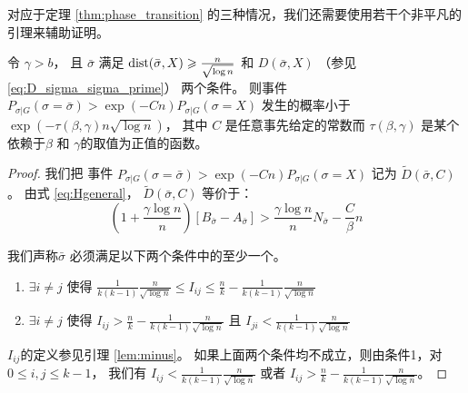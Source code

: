   对应于定理 \ref{thm:phase_transition}  的三种情况，我们还需要使用若干个非平凡的引理来辅助证明。

  \begin{lemma}\label{lem:sigmaX}
    令 $\gamma > b$， 且 $\bar{\sigma}$ 满足 $\operatorname{dist}(\bar{\sigma}, X) \geqslant \frac{n}{\sqrt{\log n}}$
    和 $D(\bar{\sigma}, X)$
    （参见\eqref{eq:D_sigma_sigma_prime}）
    两个条件。
    则事件
    $P_{\sigma | G}(\sigma = \bar{\sigma} ) > \exp(-Cn) P_{\sigma | G}(\sigma = X)$
    发生的概率小于 $\exp(-\tau(\beta, \gamma) n \sqrt{\log  n} )$，
    其中 $C$ 是任意事先给定的常数而 
    $\tau(\beta, \gamma)$
   是某个依赖于$\beta$ 和 $\gamma$的取值为正值的函数。
  \end{lemma}
  \begin{proof}
    我们把 事件 $P_{\sigma | G}(\sigma = \bar{\sigma} ) > \exp(-Cn) P_{\sigma | G}(\sigma = X)$
    记为 $\widetilde{D}(\bar{\sigma}, C)$。
    由式 \eqref{eq:Hgeneral}， $\widetilde{D}(\bar{\sigma}, C)$
    等价于：
  \begin{equation}\label{eq:BwA}
    \left(1 + \frac{\gamma \log n}{n} \right)
    [B_{\bar{\sigma}} - A_{\bar{\sigma}}] >  \frac{\gamma \log n}{n} N_{\bar{\sigma}}  - \frac{C}{\beta} n
    \end{equation}  
    
    我们声称$\bar{\sigma}$  必须满足以下两个条件中的至少一个。
    \begin{enumerate}
      \item $\exists i\neq j$ 使得 $\frac{1}{k(k-1)}\frac{n}{\sqrt{\log n}} \leq I_{ij} \leq \frac{n}{k} - \frac{1}{k(k-1)}\frac{n}{\sqrt{\log n}}$
      \item $\exists i \neq j$ 使得 $I_{ij} > \frac{n}{k} - \frac{1}{k(k-1)}\frac{n}{\sqrt{\log n}}$ 且 $I_{ji} < \frac{1}{k(k-1)}\frac{n}{\sqrt{\log n}}$
    \end{enumerate}
    $I_{ij}$的定义参见引理
    \ref{lem:minus}。
    如果上面两个条件均不成立，则由条件1，对 $0 \leq i,j\leq k-1$，
    我们有
    $I_{ij} < \frac{1}{k(k-1)}\frac{n}{\sqrt{\log n}}$
    或者 $I_{ij} > \frac{n}{k} - \frac{1}{k(k-1)}\frac{n}{\sqrt{\log n}}$。
    

\end{proof}
